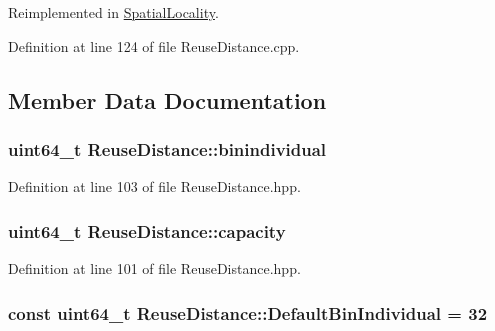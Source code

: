 Reimplemented in \hyperlink{class_spatial_locality_a72a96a67e1791851927dbf3e5ceb206f}{SpatialLocality}.



Definition at line 124 of file ReuseDistance.cpp.



\subsection{Member Data Documentation}
\hypertarget{class_reuse_distance_a62dae87cc1183b8bcbfa2220ddd9a3e2}{
\subsubsection[{binindividual}]{\setlength{\rightskip}{0pt plus 5cm}uint64\_\-t {\bf ReuseDistance::binindividual}}}
\label{class_reuse_distance_a62dae87cc1183b8bcbfa2220ddd9a3e2}


Definition at line 103 of file ReuseDistance.hpp.

\hypertarget{class_reuse_distance_a8e3536264e92460f10455af7f1e161fd}{
\subsubsection[{capacity}]{\setlength{\rightskip}{0pt plus 5cm}uint64\_\-t {\bf ReuseDistance::capacity}}}
\label{class_reuse_distance_a8e3536264e92460f10455af7f1e161fd}


Definition at line 101 of file ReuseDistance.hpp.

\hypertarget{class_reuse_distance_af0d9cba7105109e89ae6b7177f54c976}{
\subsubsection[{DefaultBinIndividual}]{\setlength{\rightskip}{0pt plus 5cm}const uint64\_\-t {\bf ReuseDistance::DefaultBinIndividual} = 32}}
\label{class_reuse_distance_af0d9cba7105109e89ae6b7177f54c976}


